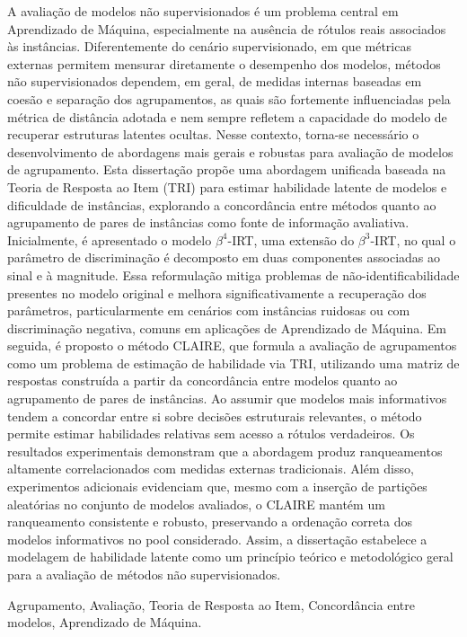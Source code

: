 \documentclass{ufpethesis}
\begin{document}
A avaliação de modelos não supervisionados é um problema central em Aprendizado de Máquina, especialmente na ausência de rótulos reais associados às instâncias. Diferentemente do cenário supervisionado, em que métricas externas permitem mensurar diretamente o desempenho dos modelos, métodos não supervisionados dependem, em geral, de medidas internas baseadas em coesão e separação dos agrupamentos, as quais são fortemente influenciadas pela métrica de distância adotada e nem sempre refletem a capacidade do modelo de recuperar estruturas latentes ocultas. Nesse contexto, torna-se necessário o desenvolvimento de abordagens mais gerais e robustas para avaliação de modelos de agrupamento. Esta dissertação propõe uma abordagem unificada baseada na Teoria de Resposta ao Item (TRI) para estimar habilidade latente de modelos e dificuldade de instâncias, explorando a concordância entre métodos quanto ao agrupamento de pares de instâncias como fonte de informação avaliativa. Inicialmente, é apresentado o modelo $\beta^4$-IRT, uma extensão do $\beta^3$-IRT, no qual o parâmetro de discriminação é decomposto em duas componentes associadas ao sinal e à magnitude. Essa reformulação mitiga problemas de não-identificabilidade presentes no modelo original e melhora significativamente a recuperação dos parâmetros, particularmente em cenários com instâncias ruidosas ou com discriminação negativa, comuns em aplicações de Aprendizado de Máquina. Em seguida, é proposto o método CLAIRE, que formula a avaliação de agrupamentos como um problema de estimação de habilidade via TRI, utilizando uma matriz de respostas construída a partir da concordância entre modelos quanto ao agrupamento de pares de instâncias. Ao assumir que modelos mais informativos tendem a concordar entre si sobre decisões estruturais relevantes, o método permite estimar habilidades relativas sem acesso a rótulos verdadeiros. Os resultados experimentais demonstram que a abordagem produz ranqueamentos altamente correlacionados com medidas externas tradicionais. Além disso, experimentos adicionais evidenciam que, mesmo com a inserção de partições aleatórias no conjunto de modelos avaliados, o CLAIRE mantém um ranqueamento consistente e robusto, preservando a ordenação correta dos modelos informativos no pool considerado. Assim, a dissertação estabelece a modelagem de habilidade latente como um princípio teórico e metodológico geral para a avaliação de métodos não supervisionados.
\begin{keywords}
Agrupamento, Avaliação, Teoria de Resposta ao Item, Concordância entre modelos, Aprendizado de Máquina.
\end{keywords}
\end{document}
